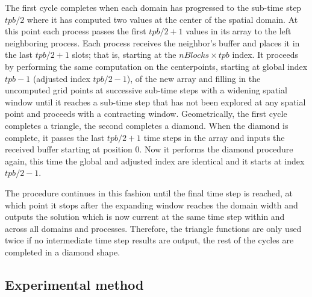 The first cycle completes when each domain has progressed to the sub-time step $tpb/2$
where it has computed two values at the center of the spatial domain.
At this point each process passes the first $tpb/2 + 1$ values in its array to the left neighboring process.
Each process receives the neighbor's buffer and places it in the last $tpb/2 + 1$ slots; that is, starting at the $nBlocks \times tpb$ index.
It proceeds by performing the same computation on the centerpoints, starting at global index $tpb-1$ (adjusted index $tpb/2-1$), of the new array and filling in the uncomputed grid points at successive sub-time steps with a widening spatial window until it reaches a sub-time step that has not been explored at any spatial point and proceeds with a contracting window.
Geometrically, the first cycle completes a triangle, the second completes a diamond.
When the diamond is complete, it passes the last $tpb/2 + 1$ time steps in the array and inputs the received buffer starting at position 0.
Now it performs the diamond procedure again, this time the global and adjusted index are identical and it starts at index $tpb/2 - 1$.

The procedure continues in this fashion until the final time step is reached, at which point it stops after the expanding window reaches the domain width and outputs the solution which is now current at the same time step within and across all domains and processes.
Therefore, the triangle functions are only used twice if no intermediate time step results are output, the rest of the cycles are completed in a diamond shape.



\subsection{Experimental method} \label{sec:ExpMethod}

